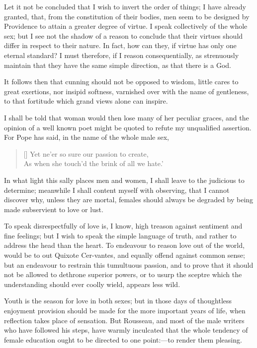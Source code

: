 Let it not be concluded that I wish to invert the order of things; I
have already granted, that, from the constitution of their bodies, men
seem to be designed by Providence to attain a greater degree of
virtue. I speak collectively of the whole sex; but I see not the
shadow of a reason to conclude that their virtues should differ in
respect to their nature. In fact, how can they, if virtue has only one
eternal standard? I must therefore, if I reason consequentially, as
strenuously maintain that they have the same simple direction, as that
there is a God.

It follows then that cunning should not be opposed to wisdom,
little cares to great exertions, nor insipid softness, varnished over
with the name of gentleness, to that fortitude which grand views alone
can inspire.

I shall be told that woman would then lose many of her peculiar
graces, and the opinion of a well known poet might be quoted to refute
my unqualified assertion. For Pope has said, in the name of the whole
male sex,

\settowidth{}
\begin{verse}[\versewidth]
Yet ne'er so sure our passion to create,\\
As when she touch'd the brink of all we hate.'
\end{verse}

In what light this sally places men and women, I shall leave to the
judicious to determine; meanwhile I shall content myself with
observing, that I cannot discover why, unless they are mortal, females
should always be degraded by being made subservient to love or lust.

To speak disrespectfully of love is, I know, high treason against
sentiment and fine feelings; but I wish to speak the simple language
of truth, and rather to address the head than the heart. To endeavour
to reason love out of the world, would be to out Quixote
Cer-vantes, and equally offend against common sense; but an
endeavour to restrain this tumultuous passion, and to prove that it
should not be allowed to dethrone superior powers, or to usurp the
sceptre which the understanding should ever coolly wield, appears less
wild.

Youth is the season for love in both sexes; but in those days of
thoughtless enjoyment provision should be made for the more important
years of life, when reflection takes place of sensation. But Rousseau,
and most of the male writers who have followed his steps, have warmly
inculcated that the whole tendency of female education ought to be
directed to one point:---to render them pleasing.

